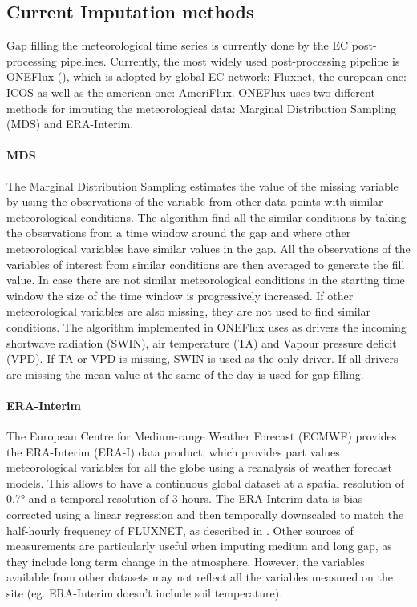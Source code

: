 \documentclass{article}
\let\Oldsubsection\subsection
\renewcommand{\subsection}{\FloatBarrier\Oldsubsection}
\begin{document}

\subsection{Current Imputation methods} Gap filling the meteorological time series is currently done by the EC post-processing pipelines. Currently, the most widely used post-processing pipeline is ONEFlux (\cite{pastorello_fluxnet2015_2020}), which is adopted by global EC network: Fluxnet, the european one: ICOS as well as the american one: AmeriFlux.
ONEFlux uses two different methods for imputing the meteorological data: Marginal Distribution Sampling (MDS) and ERA-Interim.
\paragraph{MDS} The Marginal Distribution Sampling \cite{reichstein_separation_2005} estimates the value of the missing variable by using the observations of the variable from other data points with similar meteorological conditions. The algorithm find all the similar conditions by taking the observations from a time window around the gap and where other meteorological variables have similar values in the gap. All the observations of the variables of interest from similar conditions are then averaged to generate the fill value. In case there are not similar meteorological conditions in the starting time window the size of the time window is progressively increased. If other meteorological variables are also missing, they are not used to find similar conditions.
The algorithm implemented in ONEFlux uses as drivers the incoming shortwave radiation (SW\textunderscore IN), air temperature (TA) and Vapour pressure deficit (VPD). If TA or VPD is missing, SW\textunderscore IN is used as the only driver. If all drivers are missing the mean value at the same of the day is used for gap filling.

\paragraph{ERA-Interim} The European Centre for Medium-range Weather Forecast (ECMWF) provides the ERA-Interim (ERA-I) data product, which provides part values meteorological variables for all the globe using a reanalysis of weather forecast models. This allows to have a continuous global dataset at a spatial resolution of 0.7° and a temporal resolution of 3-hours. The ERA-Interim data is bias corrected using a linear regression and then temporally downscaled to match the half-hourly frequency of FLUXNET,  as described in \cite{vuichard_filling_2015}. Other sources of measurements are particularly useful when imputing medium and long gap, as they include long term change in the atmosphere. However, the variables available from other datasets may not reflect all the variables measured on the site (eg. ERA-Interim doesn't include soil temperature).
\end{document}
